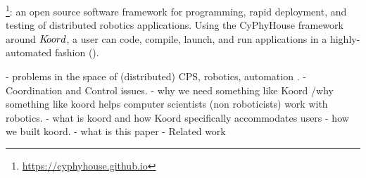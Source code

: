 


\footnote{\href{https://cyphyhouse.github.io/index.html}{https://cyphyhouse.github.io}}: an open source software framework for programming, rapid deployment, and testing of distributed robotics applications. 
Using the CyPhyHouse framework around $K\kern-2pt oord$, a user can code, compile, launch, and run applications in a highly-automated fashion (). 


    - problems in the space of (distributed) CPS, robotics, automation .
    - Coordination and Control issues. 
    - why we need something like Koord /why something like koord helps computer scientists (non roboticists) work with robotics. 
    - what is koord and how Koord specifically accommodates users
    - how we built koord. 
    - what is this paper
    - Related work
    
